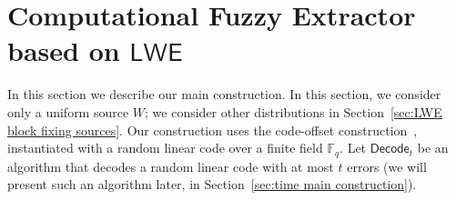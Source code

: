 \documentclass[11pt]{article}
\newcommand{\secref}[1]{\mbox{Section~\ref{#1}}}
\newcommand{\defref}[1]{\mbox{Definition~\ref{#1}}}
\newcommand{\class}[1]{{\ensuremath{\mathsf{#1}}}}
\newcommand{\sketch}{\ensuremath{\class{SS}}\xspace}
\newcommand{\rec}{\ensuremath{\class{Rec}}\xspace}
\newcommand{\Fq}{\ensuremath{\mathbb{F}_q}}
\newcommand{\decode}{\ensuremath{\mathsf{Decode}}}
\newcommand{\hill}{\ensuremath{\mathtt{HILL}}\xspace}
\newcommand{\LWE}{\class{LWE}}
\begin{document}
%

\section{Computational Fuzzy Extractor based on \class{LWE}}
\label{sec:fuzzyCompExt}

In this section we describe our main construction.  In this section, we consider only a uniform source $W$; we consider other distributions in \secref{sec:LWE block fixing sources}.  Our construction uses the code-offset construction~\cite{JW99},\cite[Section 5]{DBLP:journals/siamcomp/DodisORS08} instantiated with a random linear code over a finite field $\Fq$.   Let $\decode_t$ be an algorithm that decodes a random linear code with at most $t$ errors (we will present such an algorithm later, in \secref{sec:time main construction}). 
\end{document}
